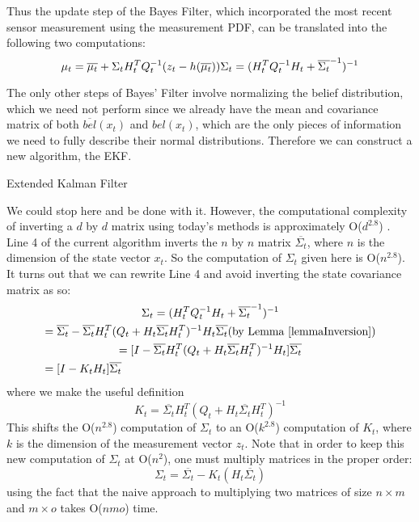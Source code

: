 Thus the update step of the Bayes Filter, which incorporated the most recent sensor measurement using the measurement PDF, can be translated into the following two computations:
\[
\mu_t = \overline{\mu_t} + \Sigma_t H_t^TQ_t^{-1}(z_t - h(\overline{\mu_t})) \\
\Sigma_t = (H_t^T Q_t^{-1} H_t + \overline{\Sigma_t}^{-1})^{-1}
\]

The only other steps of Bayes' Filter involve normalizing the belief distribution, which we need not perform since we already have the mean and covariance matrix of both \(\overline{bel}(x_t)\) and \(bel(x_t)\), which are the only pieces of information we need to fully describe their normal distributions. Therefore we can construct a new algorithm, the EKF.
\begin{algorithm} 
	\caption{Extended Kalman Filter}
	\label{alg:EKFnonOptimal}
	\begin{algorithmic}[1]
		\State {}
		\EndFunction
	\end{algorithmic}
\end{algorithm}

We could stop here and be done with it. However, the computational complexity of inverting a \(d\) by \(d\) matrix using today's methods is approximately O(\(d^{2.8}\)) \cite{}. Line 4 of the current algorithm inverts the \(n\) by \(n\) matrix \(\overline{\Sigma_t}\), where \(n\) is the dimension of the state vector \(x_t\). So the computation of \(\Sigma_t\) given here is O(\(n^{2.8}\)). It turns out that we can rewrite Line 4 and avoid inverting the state covariance matrix as so:
\begin{multline*}
\Sigma_t = (H_t^T Q_t^{-1} H_t + \overline{\Sigma_t}^{-1})^{-1} \\
= \overline{\Sigma_t} - \overline{\Sigma_t} H_t^T (Q_t + H_t \overline{\Sigma_t} H_t^T)^{-1} H_t \overline{\Sigma_t} \hfill \text{(by Lemma \ref{lemmaInversion})} \\
= [ I - \overline{\Sigma_t} H_t^T (Q_t + H_t \overline{\Sigma_t} H_t^T)^{-1} H_t ] \overline{\Sigma_t} \\
= [I - K_t H_t] \overline{\Sigma_t} \hfill
\end{multline*}
where we make the useful definition 
\[
K_t = \overline{\Sigma_t} H_t^T (Q_t + H_t \overline{\Sigma_t} H_t^T)^{-1}
\]
This shifts the O(\(n^{2.8}\)) computation of \(\Sigma_t\) to an O(\(k^{2.8}\)) computation of \(K_t\), where \(k\) is the dimension of the measurement vector \(z_t\). Note that in order to keep this new computation of \(\Sigma_t\) at O(\(n^2\)), one must multiply matrices in the proper order:
\[\Sigma_t = \overline{\Sigma_t} - K_t (H_t \overline{\Sigma_t})
\]
using the fact that the naive approach to multiplying two matrices of size \(n \times m\) and \(m \times o\) takes O(\(n m o\)) time.


